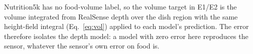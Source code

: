 Nutrition5k has no food-volume label, so the volume target in E1/E2 is the
volume integrated from RealSense depth over the dish region with the same
height-field integral (Eq.~\ref{eq:vol}) applied to each model's prediction.
The error therefore isolates the depth model: a model with zero error here
reproduces the sensor, whatever the sensor's own error on food is.

